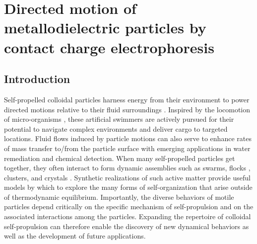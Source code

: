 \chapter{Directed motion of metallodielectric particles by contact charge electrophoresis}
\section{Introduction}

Self-propelled colloidal particles harness energy from their environment to power directed motions relative to their fluid surroundings \cite{ebbens2016active,Li2016,Dey2016}.
Inspired by the locomotion of micro-organisms \cite{Lauga2009}, these artificial swimmers are actively pursued for their potential to navigate complex environments \cite{Takagi2014,Das2015} and deliver cargo to targeted locations\cite{Gao2015,Baylis2015}.
Fluid flows induced by particle motions can also serve to enhance rates of mass transfer to/from the particle surface with emerging applications in water remediation\cite{Soler2013,Li2014} and chemical detection\cite{morales2014micromotor,kagan2009chemical}.
When many self-propelled particles get together, they often interact to form dynamic assemblies\cite{Wang2015} such as swarms\cite{Ibele2009,Nguyen2012}, flocks \cite{Bricard2013}, clusters\cite{JieZhang2016}, and crystals \cite{Palacci2013}.
Synthetic realizations of such active matter\cite{Marchetti2013} provide useful models by which to explore the many forms of self-organization that arise outside of thermodynamic equilibrium.
Importantly, the diverse behaviors of motile particles depend critically on the specific mechanism of self-propulsion and on the associated interactions among the particles.
Expanding the repertoire of colloidal self-propulsion can therefore enable the discovery of new dynamical behaviors as well as the development of future applications.


